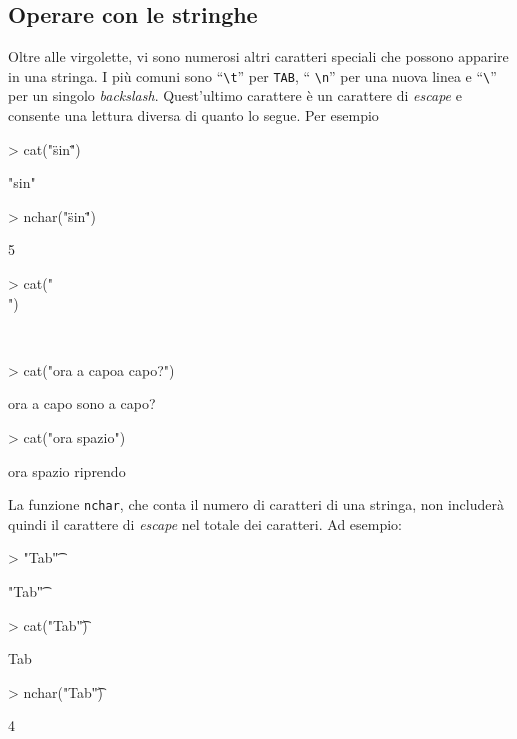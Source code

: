 \documentclass[onecolumn,12pt]{book}
\begin{document}
\subsection{Operare con le stringhe}
Oltre alle virgolette, vi sono numerosi altri caratteri speciali che possono apparire in una stringa.
I pi\`u comuni sono ``\texttt{\textbackslash t}'' per \texttt{TAB}, `` \texttt{\textbackslash n}'' per una nuova linea e ``\texttt{\textbackslash }'' per un singolo {\it backslash}.
Quest'ultimo carattere \`e un carattere di \emph{escape} e consente una lettura diversa di quanto lo segue.  Per esempio
\begin{Schunk}
\begin{Sinput}
> cat("\"sin\"")
\end{Sinput}
\begin{Soutput}
"sin"
\end{Soutput}
\begin{Sinput}
> nchar("\"sin\"")
\end{Sinput}
\begin{Soutput}
[1] 5
\end{Soutput}
\begin{Sinput}
> cat("\\")
\end{Sinput}
\begin{Soutput}
\
\end{Soutput}
\begin{Sinput}
> cat("ora a capo\nsono a capo?")
\end{Sinput}
\begin{Soutput}
ora a capo
sono a capo?
\end{Soutput}
\begin{Sinput}
> cat("ora spazio\triprendo")
\end{Sinput}
\begin{Soutput}
ora spazio	riprendo
\end{Soutput}
\end{Schunk}
La funzione \texttt{nchar},  che conta il numero di caratteri di una stringa, non includer\`a quindi il carattere di \emph{escape} nel totale dei caratteri. Ad esempio:
\begin{Schunk}
\begin{Sinput}
> "Tab\t"
\end{Sinput}
\begin{Soutput}
[1] "Tab\t"
\end{Soutput}
\begin{Sinput}
> cat("Tab\t")
\end{Sinput}
\begin{Soutput}
Tab	
\end{Soutput}
\begin{Sinput}
> nchar("Tab\t")
\end{Sinput}
\begin{Soutput}
[1] 4
\end{Soutput}
\end{Schunk}
\end{document}
